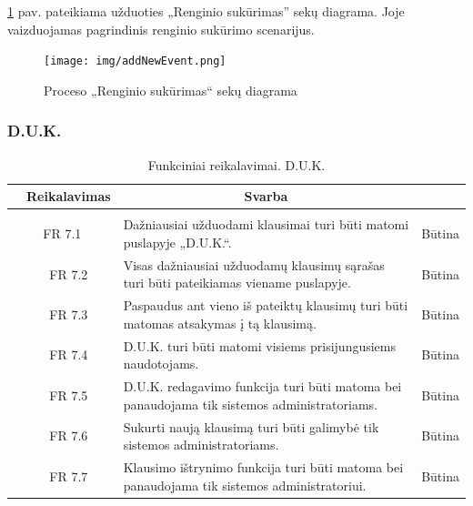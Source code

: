 \documentclass{VUMIFPSkursinis}
\begin{document}
\ref{fig:addevent} pav. pateikiama užduoties „Renginio sukūrimas” sekų diagrama. Joje vaizduojamas pagrindinis
renginio sukūrimo scenarijus.
\begin{figure}[H]
	\centering
	\texttt{[image: img/addNewEvent.png]}
	\caption{Proceso „Renginio sukūrimas“ sekų diagrama}
	\label{fig:addevent}
\end{figure}

\subsubsection{D.U.K.}
\begin{table}[H]
	\caption{Funkciniai reikalavimai. D.U.K.}
	\begin{tabular}{|p{1cm}|p{1cm}|p{}|p{}|}
		\hline 
		\rowcolor{gray!50}
		\multicolumn{2}{|c|}{{\bfseries Kodas}}&
		\multicolumn{1}{c|}{{\bfseries Reikalavimas}}&
		\multicolumn{1}{c|}{{\bfseries Svarba}}\\
		\hline
		\rowcolor{lightgray}
		\multicolumn{4}{|c|}{D.U.K.}\\		
		
		\hline
		\multicolumn{2}{|c|}{FR 7.1}&
		{Dažniausiai užduodami klausimai turi būti matomi puslapyje „D.U.K.“.
		}&		
		\multicolumn{1}{c|}{Būtina}\\
		\hline
		\multicolumn{1}{|c}{}&
		\multicolumn{1}{c|}{FR 7.2}&
		{Visas dažniausiai užduodamų klausimų sąrašas turi būti pateikiamas viename puslapyje.
		}&		
		\multicolumn{1}{c|}{Būtina}\\
		\hline
		\multicolumn{1}{|c}{}&
		\multicolumn{1}{c|}{FR 7.3}&
		{Paspaudus ant vieno iš pateiktų klausimų turi būti matomas atsakymas į tą klausimą.
		}&
		\multicolumn{1}{c|}{Būtina}\\	
		\hline		
		\multicolumn{1}{|c}{}&
		\multicolumn{1}{c|}{FR 7.4}&
		{D.U.K. turi būti matomi visiems prisijungusiems naudotojams.
		}&
		\multicolumn{1}{c|}{Būtina}\\									
		\hline
		\multicolumn{1}{|c}{}&
		\multicolumn{1}{c|}{FR 7.5}&
		{D.U.K. redagavimo funkcija turi būti matoma bei panaudojama tik sistemos administratoriams.
		}&
		\multicolumn{1}{c|}{Būtina}\\	
		\hline	
		\multicolumn{1}{|c}{}&
		\multicolumn{1}{c|}{FR 7.6}&
		{Sukurti naują klausimą turi būti galimybė tik sistemos administratoriams.
		}&
		\multicolumn{1}{c|}{Būtina}\\	
		\hline	
		\multicolumn{1}{|c}{}&
		\multicolumn{1}{c|}{FR 7.7}&
		{Klausimo ištrynimo funkcija turi būti matoma bei panaudojama tik sistemos administratoriui.
		}&
		\multicolumn{1}{c|}{Būtina}\\	
		\hline	
	\end{tabular}		
\end{table}
\end{document}
